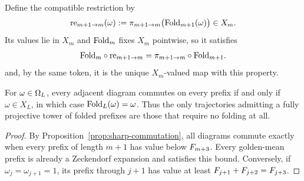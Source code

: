 Define the compatible restriction by
\begin{equation}\label{eq:re-def}
\mathrm{re}_{m+1\to m}(\omega):=\pi_{m+1\to m}\bigl(\mathrm{Fold}_{m+1}(\omega)\bigr)\in X_m.
\end{equation}
Its values lie in \(X_m\) and \(\mathrm{Fold}_m\) fixes \(X_m\) pointwise, so it satisfies
\begin{equation}\label{eq:commuting}
\mathrm{Fold}_m\circ\mathrm{re}_{m+1\to m}=\pi_{m+1\to m}\circ\mathrm{Fold}_{m+1}.
\end{equation}
and, by the same token, it is the unique \(X_m\)-valued map with this property.

\begin{corollary}\label{cor:all-depth-commutation}
For \(\omega\in\Omega_L\), every adjacent diagram commutes on every prefix if and only if \(\omega\in X_L\), in which case \(\mathrm{Fold}_L(\omega)=\omega\). Thus the only trajectories admitting a fully projective tower of folded prefixes are those that require no folding at all.
\end{corollary}

\begin{proof}
By Proposition~\ref{prop:sharp-commutation}, all diagrams commute exactly when every prefix of length \(m+1\) has value below \(F_{m+3}\). Every golden-mean prefix is already a Zeckendorf expansion and satisfies this bound. Conversely, if \(\omega_j=\omega_{j+1}=1\), its prefix through \(j+1\) has value at least \(F_{j+1}+F_{j+2}=F_{j+3}\).
\end{proof}
